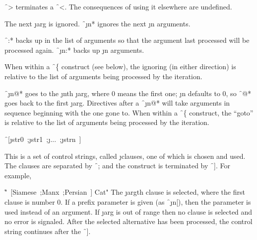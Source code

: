 \endsubsubsection%

 

\f{~>} terminates a \f{~<}. The consequences of using it elsewhere are undefined.

\endsubsubsection%

\endsubsection%


 

                                                 The next \j{arg} is ignored. \f{~\j{n}*} ignores the next \j{n} arguments.

\f{~:*} backs up in the list of arguments so that the argument last processed will be processed again. \f{~\j{n}:*} backs up \j{n} arguments.

When within a \f{~\{} construct (see below), the ignoring (in either direction) is relative to the list of arguments being processed by the iteration.

\f{~\j{n}@*}  goes to the \j{n}th \j{arg}, where 0 means the first one; \j{n} defaults to 0, so \f{~@*} goes back to the first \j{arg}.       Directives after a \f{~\j{n}@*} will take arguments in sequence beginning with the one gone to. When within a \f{~\{} construct, the ``goto'' is relative to the list of arguments being processed by the iteration.

\endsubsubsection%

 

\f{~[\j{str0}~;\j{str1}~;\j{...}~;\j{strn}~]}

This is a set of control strings, called \j{clauses}, one of which is chosen and used.  The clauses are separated by \f{~;} and the construct is terminated by \f{~]}.  For example,

\f{"~[Siamese~;Manx~;Persian~] Cat"}
                               The \j{arg}th clause is selected, where the first clause is number 0. If a prefix parameter is given (as \f{~\j{n}[}), then the parameter is used instead of an argument.     If \j{arg} is out of range then no clause is selected and no error is signaled. After the selected alternative has been processed, the control string continues after the \f{~]}.

